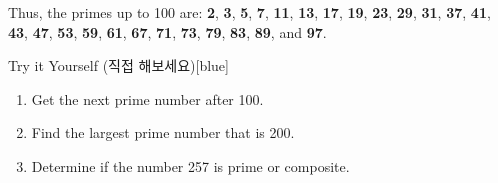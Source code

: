 \documentclass[12pt]{book}
\begin{document}
  Thus, the primes up to 100 are: \textbf{2}, \textbf{3}, \textbf{5}, 
  \textbf{7}, \textbf{11}, \textbf{13}, \textbf{17}, \textbf{19}, \textbf{23}, 
  \textbf{29}, \textbf{31}, \textbf{37}, \textbf{41}, \textbf{43}, \textbf{47}, 
  \textbf{53}, \textbf{59}, \textbf{61}, \textbf{67}, \textbf{71}, \textbf{73}, 
  \textbf{79}, \textbf{83}, \textbf{89}, and \textbf{97}.
  \begin{flexbox}{Try it Yourself (직접 해보세요)}[blue]
    \begin{enumerate}
      \item Get the next prime number after 100.\vspace*{20pt}
      \item Find the largest prime number that is  200.\vspace*{20pt}
      \item Determine if the number 257 is prime or composite.\vspace*{20pt}
    \end{enumerate}
  \end{flexbox}









\end{document}
